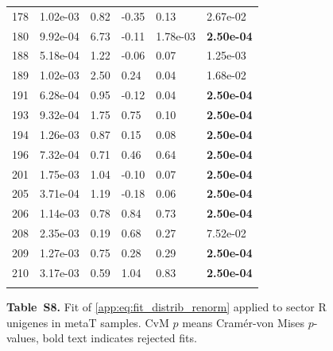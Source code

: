 \begin{figure}[htbp!]
{\begin{minipage}[t]{0.48\linewidth}
\begin{tabular}{llllll}
                    178 & 1.02e-03 & 0.82 & -0.35 & 0.13 & 2.67e-02\\
                    180 & 9.92e-04 & 6.73 & -0.11 & 1.78e-03 & \textbf{2.50e-04}\\
                    188 & 5.18e-04 & 1.22 & -0.06 & 0.07 & 1.25e-03\\
                    189 & 1.02e-03 & 2.50 & 0.24 & 0.04 & 1.68e-02\\
                    191 & 6.28e-04 & 0.95 & -0.12 & 0.04 & \textbf{2.50e-04}\\
                    193 & 9.32e-04 & 1.75 & 0.75 & 0.10 & \textbf{2.50e-04}\\
                    194 & 1.26e-03 & 0.87 & 0.15 & 0.08 & \textbf{2.50e-04}\\
                    196 & 7.32e-04 & 0.71 & 0.46 & 0.64 & \textbf{2.50e-04}\\
                    201 & 1.75e-03 & 1.04 & -0.10 & 0.07 & \textbf{2.50e-04}\\
                    205 & 3.71e-04 & 1.19 & -0.18 & 0.06 & \textbf{2.50e-04}\\
                    206 & 1.14e-03 & 0.78 & 0.84 & 0.73 & \textbf{2.50e-04}\\
                    208 & 2.35e-03 & 0.19 & 0.68 & 0.27 & 7.52e-02\\
                    209 & 1.27e-03 & 0.75 & 0.28 & 0.29 & \textbf{2.50e-04}\\
                    210 & 3.17e-03 & 0.59 & 1.04 & 0.83 & \textbf{2.50e-04}\\
                     &  &  &  &  & \\
        \bottomrule
        \end{tabular}
    \end{minipage}
    }
    \caption*{\textbf{Table~S8.} Fit of \eqref{app:eq:fit_distrib_renorm} applied to sector R unigenes in metaT samples. CvM $p$ means Cram\'er-von Mises $p$-values, bold text indicates rejected fits.}
    \label{subtab:app:sector:metaT:R}
\end{figure}